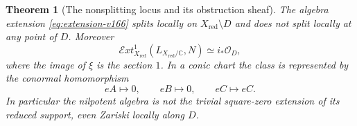 \documentclass[11pt,reqno]{amsart}
\numberwithin{equation}{section}
\newtheorem{theorem}{Theorem}[section]
\theoremstyle{definition}\newtheorem{definition}[theorem]{Definition}
\theoremstyle{remark}\newtheorem{remark}[theorem]{Remark}
\newcommand{\C}{\mathbb C}\newcommand{\Q}{\mathbb Q}
\newcommand{\OO}{\mathcal O}\newcommand{\II}{\mathcal I}
\begin{document}
\begin{theorem}[The nonsplitting locus and its obstruction sheaf]
\label{thm:extension-class-v166}
The algebra extension \eqref{eq:extension-v166} splits locally on
$X_{\mathrm{red}}\setminus D$ and does not split locally at any
point of $D$. Moreover
\begin{equation}\label{eq:extension-sheaf-v166}
 \mathcal E xt^1_{X_{\mathrm{red}}}
       (L_{X_{\mathrm{red}}/\C},N)\simeq i_*\OO_D,
\end{equation}
where the image of $\xi$ is the section $1$. In a conic chart the
class is represented by the conormal homomorphism
\begin{equation}\label{eq:extension-map-v166}
 eA\longmapsto0,\qquad eB\longmapsto0,\qquad eC\longmapsto eC.
\end{equation}
In particular the nilpotent algebra is not the trivial square-zero
extension of its reduced support, even Zariski locally along $D$.
\end{theorem}
\end{document}
